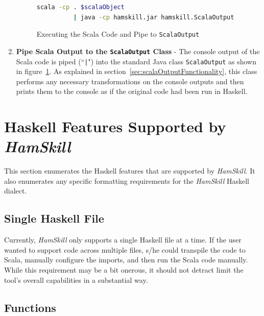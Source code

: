 \documentclass{report}
\begin{document}
\begin{enumerate}
\begin{figure}[H]
\begin{mdframed}
\begin{lstlisting}[language=bash]
scala -cp . $scalaObject 
          | java -cp hamskill.jar hamskill.ScalaOutput
\end{lstlisting}
\end{mdframed}
\caption{Executing the Scala Code and Pipe to \texttt{ScalaOutput}}\label{fig:runScalaAndConvertOutput}
\end{figure}

\item \textbf{Pipe Scala Output to the \texttt{ScalaOutput} Class} - The console output of the Scala code is piped (``\texttt{|}") into the standard Java class \texttt{ScalaOutput} as shown in figure~\ref{fig:runScalaAndConvertOutput}.  As explained in section~\ref{sec:scalaOutputFunctionality}, this class performs any necessary transformations on the console outputs and then prints them to the console as if the original code had been run in Haskell.

\end{enumerate} 

\section{Haskell Features Supported by \textit{HamSkill}}\label{sec:hamskillFeatures}

This section enumerates the Haskell features that are supported by \textit{HamSkill}.  It also enumerates any specific formatting requirements for the \textit{HamSkill} Haskell dialect.

\subsection{Single Haskell File}

Currently, \textit{HamSkill} only supports a single Haskell file at a time.  If the user wanted to support code across multiple files, s/he could transpile the code to Scala, manually configure the imports, and then run the Scala code manually.  While this requirement may be a bit onerous, it should not detract limit the tool's overall capabilities in a substantial way.

\subsection{Functions}
\end{document}
